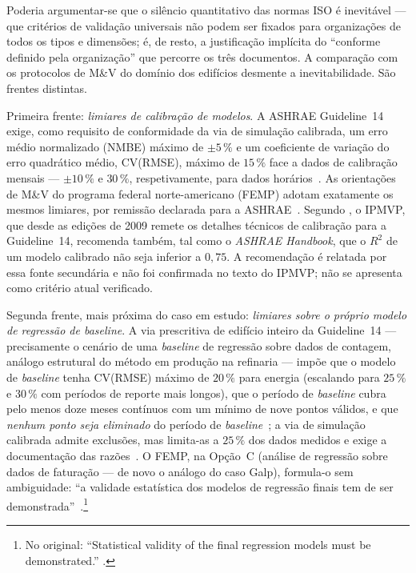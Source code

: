 Poderia argumentar-se que o silêncio quantitativo das normas ISO é inevitável --- que critérios de validação universais não podem ser fixados para organizações de todos os tipos e dimensões; é, de resto, a justificação implícita do \enquote{conforme definido pela organização} que percorre os três documentos. A comparação com os protocolos de M\&V do domínio dos edifícios desmente a
inevitabilidade. São
 frentes distintas.

Primeira frente: \emph{limiares de calibração de modelos}. A ASHRAE Guideline~14 exige, como requisito de conformidade da via de simulação calibrada, um erro médio normalizado (NMBE) máximo de $\pm 5\,\%$ e um coeficiente de variação do erro quadrático médio, CV(RMSE), máximo de $15\,\%$ face a dados de calibração mensais --- $\pm 10\,\%$ e $30\,\%$, respetivamente, para dados horários~\cite[\S4.3.2.4\,f), \S5.3.3.3.10]{ASHRAE14_2014}. As orientações de M\&V do programa federal norte-americano (FEMP) adotam exatamente os mesmos limiares, por remissão declarada para a ASHRAE~\cite[\S4.5.3.2, Tabela~4-2]{FEMP_2015}. Segundo \textcite{RuizBandera2017}, o IPMVP, que desde as edições de 2009 remete os detalhes técnicos de calibração para a Guideline~14, recomenda também, tal como o \emph{ASHRAE Handbook}, que o $R^2$ de um modelo calibrado não seja inferior a $0{,}75$. A recomendação é relatada por essa fonte secundária e não foi confirmada no texto do IPMVP; não se apresenta como critério atual verificado.

Segunda frente, mais próxima do caso em estudo: \emph{limiares sobre o próprio modelo de regressão de baseline}. A via prescritiva de edifício inteiro da Guideline~14 --- precisamente o cenário de uma \emph{baseline} de regressão sobre dados de contagem, análogo estrutural do método em produção na refinaria --- impõe que o modelo de \emph{baseline} tenha CV(RMSE) máximo de $20\,\%$ para energia (escalando para $25\,\%$ e $30\,\%$ com períodos de reporte mais longos), que o período de \emph{baseline} cubra pelo menos doze meses contínuos com um mínimo de nove pontos válidos, e que \emph{nenhum ponto seja eliminado} do período de \emph{baseline}~\cite[\S4.3.2.1]{ASHRAE14_2014}; a via de simulação calibrada admite exclusões, mas limita-as a $25\,\%$ dos dados medidos e exige a documentação das razões~\cite[\S4.3.2.4]{ASHRAE14_2014}. O FEMP, na Opção~C (análise de regressão sobre dados de faturação --- de novo o análogo do caso Galp), formula-o sem ambiguidade: \enquote{a validade estatística dos modelos de regressão finais tem de ser demonstrada}~\cite[\S4.4]{FEMP_2015}.\footnote{No original: \enquote{Statistical validity of the final regression models must be demonstrated.} \cite[\S4.4]{FEMP_2015}.}

